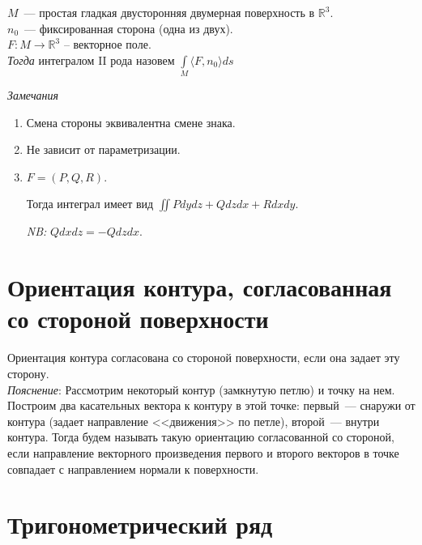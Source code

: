 \documentclass[paper=a4, fontsize=17pt]{article}
\begin{document}
	$M$~--- простая гладкая двусторонняя двумерная поверхность в $\mathds{R}^3$.\\
	$n_0$~--- фиксированная сторона (одна из двух).\\
	$F : M \rightarrow \mathbb{R}^3$ -- векторное поле.\\

	\emph{Тогда} интегралом II рода назовем $\int\limits_{M} \langle F, n_0 \rangle ds$

	\emph{Замечания}
	\begin{enumerate}
		\item Смена стороны эквивалентна смене знака.
		\item Не зависит от параметризации.
		\item
		$F=(P, Q, R)$.

		Тогда интеграл имеет вид $\iint P dydz + Q dzdx + R dxdy$.

		\emph{NB:} $Q dxdz = -Q dzdx$.
	\end{enumerate}

	\section{Ориентация контура, согласованная со стороной поверхности}

	Ориентация контура согласована со стороной поверхности, если она задает эту сторону.\\

	\emph{Пояснение}:
	Рассмотрим некоторый контур (замкнутую петлю) и точку на нем. Построим два касательных вектора к контуру в этой точке: первый~--- снаружи от контура (задает направление <<движения>> по петле), второй~--- внутри контура. Тогда будем называть такую ориентацию согласованной со стороной, если направление векторного произведения первого и второго векторов в точке совпадает с направлением нормали к поверхности.

	\begin{center}
	\end{center}

	\section{Тригонометрический ряд}
\end{document}
